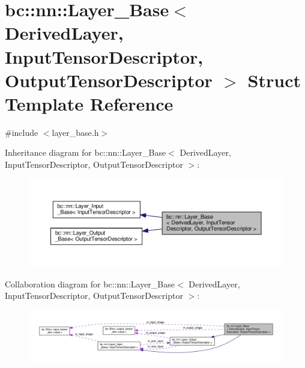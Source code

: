 \hypertarget{structbc_1_1nn_1_1Layer__Base}{}\section{bc\+:\+:nn\+:\+:Layer\+\_\+\+Base$<$ Derived\+Layer, Input\+Tensor\+Descriptor, Output\+Tensor\+Descriptor $>$ Struct Template Reference}
\label{structbc_1_1nn_1_1Layer__Base}


{\ttfamily \#include $<$layer\+\_\+base.\+h$>$}



Inheritance diagram for bc\+:\+:nn\+:\+:Layer\+\_\+\+Base$<$ Derived\+Layer, Input\+Tensor\+Descriptor, Output\+Tensor\+Descriptor $>$\+:\nopagebreak
\begin{figure}[H]
\begin{center}
\leavevmode
\includegraphics[width=350pt]{structbc_1_1nn_1_1Layer__Base__inherit__graph}
\end{center}
\end{figure}


Collaboration diagram for bc\+:\+:nn\+:\+:Layer\+\_\+\+Base$<$ Derived\+Layer, Input\+Tensor\+Descriptor, Output\+Tensor\+Descriptor $>$\+:\nopagebreak
\begin{figure}[H]
\begin{center}
\leavevmode
\includegraphics[width=350pt]{structbc_1_1nn_1_1Layer__Base__coll__graph}
\end{center}
\end{figure}
